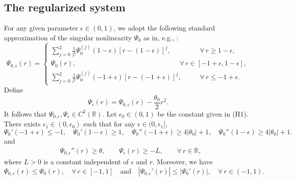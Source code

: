 \documentclass[11pt,reqno]{amsart}
\def\be{\begin{equation}}
\def\ee{\end{equation}}
\begin{document}
\subsection{The regularized system}
%
For any given parameter $\epsilon \in (0,1)$, we adopt the following standard approximation of the singular nonlinearity $\Psi_0$ as in, e.g., \cite{GiGrWu2018,GMT2019}:
%
\be
\Psi_ {0,\epsilon}(r)=
\begin{cases}
 \displaystyle{\sum_{j=0}^2 \frac{1}{j!}}
 \Psi_0^{(j)}(1-\epsilon) \left[r-(1-\epsilon)\right]^j,
 \qquad\qquad \   \forall\,r\geq 1-\epsilon,\\
 \Psi_0(r), \qquad \qquad \qquad \qquad \qquad \qquad \qquad \quad
 \forall\, r\in[-1+\epsilon, 1-\epsilon],\\
 \displaystyle{\sum_{j=0}^2
 \frac{1}{j!}} \Psi_0^{(j)}(-1+\epsilon)\left[ r-(-1+\epsilon)\right]^j,
 \qquad\ \ \ \forall\, r\leq -1+\epsilon.
 \end{cases}
 \label{vPsi}
\ee
%
Define
$$
\Psi_\epsilon(r)=\Psi_{0,\epsilon}(r)-\frac{\theta_0}{2}r^2.
$$
%
It follows that $\Psi_{0,\epsilon}, \Psi_{\epsilon}\in C^{2}(\mathbb{R})$. Let $\epsilon_0\in (0,1)$ be the constant given in (H1). There exists $\epsilon_1\in (0,\epsilon_0)$ such that for any $\epsilon\in (0,\epsilon_1]$,
$$
\Psi_0'(-1+\epsilon)\leq -1,\quad \Psi_0'(1-\epsilon)\geq 1,\quad
\Psi_0''(-1+\epsilon)\geq 4|\theta_0|+1,\quad \Psi_0''(1-\epsilon)\geq 4|\theta_0|+1.
$$
and
\begin{align*}
&\Psi_ {0,\epsilon}''(r)\ge \theta,\qquad \Psi_ {\epsilon}(r)\geq -L,\qquad \forall\, r\in \mathbb{R},
\end{align*}
where $L>0$ is a constant independent of $\epsilon$ and $r$.
Moreover, we have
$$
\Psi_{0,\epsilon}(r)\leq \Psi_{0}(r),\quad \forall\, r\in [-1,1] \quad \text{and}\quad
|\Psi_{0,\epsilon}'(r)|\leq |\Psi_{0}'(r)|,\quad \forall\, r\in (-1,1).
$$
\end{document}
